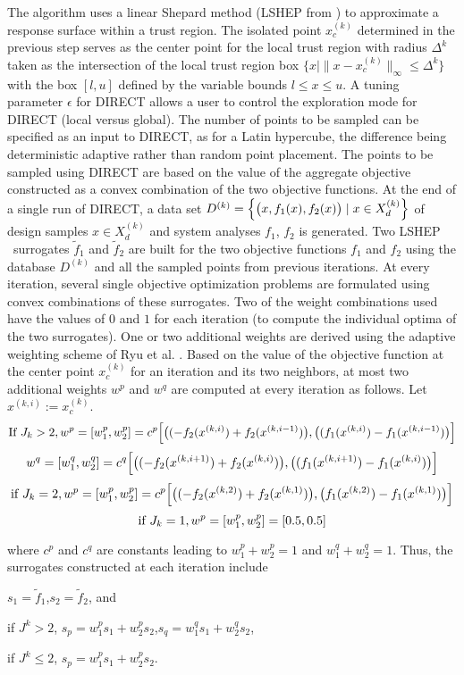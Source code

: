 \noindent The algorithm uses a linear Shepard method (LSHEP from 
\TZWBIB) to approximate a response surface within a trust region. The 
isolated point $x_c^{(k)}$ determined in the previous step serves as the center 
point for the local trust region with radius $\Delta^k$ taken as the 
intersection of the local trust region box $\bigl\{x\mid\|x-x_c^{(k)}\|_\infty 
\le\Delta^k \bigr\}$ with the box $[l,u]$ defined by the variable bounds $l\le 
x \le u$. A tuning parameter $\epsilon$ for DIRECT allows a user to control 
the exploration mode for DIRECT (local versus global). The number of points to 
be sampled can be specified as an input to DIRECT, as for a Latin hypercube, 
the difference being deterministic adaptive rather than random point placement. 
The points to be sampled using DIRECT are based on the value of the 
aggregate objective constructed as a convex combination of the two objective 
functions. At the end of a single run of DIRECT, a data set $D^{(k)}={\Bigl\{
\bigl (x, f_1(x), f_2(x)\bigr)\mid x\in X_d^{(k)} \Bigr\}}$ of design 
samples $x\in X_d^{(k)}$ and system analyses $f_1$, $f_2$ is generated. Two 
LSHEP \TZWBIB\ surrogates $\tilde f_1$ and $\tilde f_2$ are built for the two 
objective functions $f_1$ and $f_2$ using the database $D^{(k)}$ and all the 
sampled points from previous iterations. At every iteration, several single 
objective optimization problems are formulated using convex combinations of 
these surrogates. Two of the weight combinations used have the values of $0$ 
and $1$ for each iteration (to compute the individual optima of the two 
surrogates). One or two additional weights are derived using the adaptive 
weighting scheme of Ryu et al. \RKW. Based on the value of the objective 
function at the center point $x_c^{(k)}$ for an iteration and its two 
neighbors, at most two additional weights $w^p$ and $w^q$ are computed at 
every iteration as follows. Let $x^{(k,i)} := x_c^{(k)}$.
$$\hbox{If } J_k > 2, w^p=[w_1^p,w_2^p]=c^p\Bigl [\bigl ((-f_2(x^{(k,i)})+f_2(x^{(k,
i-1)})\bigr ), \bigl((f_1(x^{(k,i)})-f_1(x^{(k,i-1)})\bigr )\Bigr ]$$
$$w^q=[w_1^q,w_2^q]=c^q\Bigl [\bigl ((-f_2(x^{(k,i+1)})+f_2(x^{(k,
i)})\bigr ),\bigl((f_1(x^{(k,i+1)})-f_1(x^{(k,i)})\bigr )\Bigr ]$$
$$\hbox{if } J_k = 2, w^p=[w_1^p,w_2^p]=c^p\Bigl [\bigl ((-f_2(x^{(k,2)})+f_2(x^{(k,1)}) 
\bigr),\bigl (f_1(x^{(k,2)})-f_1(x^{(k,1)})\bigr )\Bigr ]$$
$$\hbox{if } J_k = 1, w^p = [w_1^p,w_2^p] = [0.5,0.5]$$

\noindent where $c^p$ and $c^q$ are constants leading to $w_1^p+w_2^p=1$ and 
$w_1^q+w_2^q=1$. Thus, the surrogates constructed at each iteration include 
\par\noindent $s_1 = \tilde f_1$,\quad $s_2=\tilde f_2$, \quad and
\par\noindent if $J^k > 2$,\quad 
$s_p = w_1^{p}s_1+w_2^{p}s_2$,\quad $s_q=w_1^{q}s_1+w_2^{q}s_2$,
\par\noindent if $J^k \le 2$,\quad  
$s_p = w_1^{p}s_1+w_2^{p}s_2$.\smallskip

